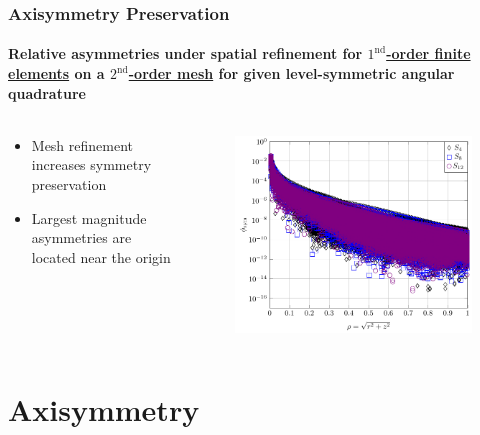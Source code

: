\documentclass[compress,t]{beamer}
\begin{document}
\begin{frame}[t]
\frametitle{Axisymmetry Preservation}
\framesubtitle{Relative asymmetries under spatial refinement for \underline{$1^\text{nd}$-order finite elements} on a \underline{$2^\text{nd}$-order mesh} for given level-symmetric angular quadrature}

\begin{columns}[T]

\begin{column}{0.4\textwidth}
\begin{itemize}
\item{Mesh refinement increases symmetry preservation}
\item{Largest magnitude asymmetries are located near the origin}
\end{itemize}

\end{column}

\begin{column}{0.6\textwidth}
\begin{figure}
\flushright
\includegraphics[scale=0.6]{./graphics/RZASMMSLinearRhoBrunnerp1g2r5.pdf}
\end{figure}

\end{column}

\end{columns}

\end{frame}

\section{Axisymmetry}
\end{document}
